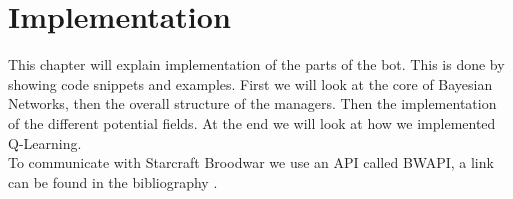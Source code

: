 \chapter{Implementation}
This chapter will explain implementation of the parts of the bot. This is done by showing code snippets and examples. First we will look at the core of Bayesian Networks, then the overall structure of the managers. Then the implementation of the different potential fields. At the end we will look at how we implemented Q-Learning.\\

To communicate with Starcraft Broodwar we use an API called BWAPI, a link can be found in the bibliography \cite{bwapi}.


	
	
	
	